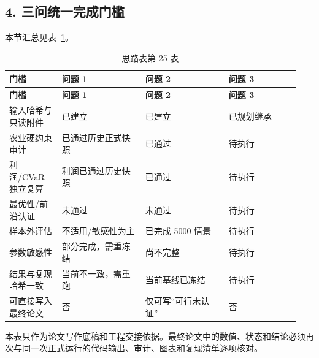 \documentclass[UTF8,11pt,a4paper]{ctexart}
\begin{document}
\subsection{4. 三问统一完成门槛}

\noindent 本节汇总见表~\ref{tab:thought-25}。
\begin{longtable}{@{}>{\raggedright\arraybackslash}p{0.17\linewidth}>{\raggedright\arraybackslash}p{0.27\linewidth}>{\raggedright\arraybackslash}p{0.27\linewidth}>{\raggedright\arraybackslash}p{0.23\linewidth}@{}}
\caption{思路表第 25 表}\label{tab:thought-25}\\
\toprule
\textbf{门槛} & \textbf{问题 1} & \textbf{问题 2} & \textbf{问题 3} \\
\midrule
\endfirsthead
\toprule
\textbf{门槛} & \textbf{问题 1} & \textbf{问题 2} & \textbf{问题 3} \\
\midrule
\endhead
输入哈希与只读附件 & 已建立 & 已建立 & 已规划继承 \\
农业硬约束审计 & 已通过历史正式快照 & 已通过 & 待执行 \\
利润/CVaR独立复算 & 利润已通过历史快照 & 已通过 & 待执行 \\
最优性/前沿认证 & 未通过 & 未通过 & 待执行 \\
样本外评估 & 不适用/敏感性为主 & 已完成 5000 情景 & 待执行 \\
参数敏感性 & 部分完成，需重冻结 & 尚不完整 & 待执行 \\
结果与复现哈希一致 & 当前不一致，需重跑 & 当前基线已冻结 & 待执行 \\
可直接写入最终论文 & 否 & 仅可写“可行未认证” & 否 \\
\bottomrule
\end{longtable}

本表只作为论文写作底稿和工程交接依据。最终论文中的数值、状态和结论必须再次与同一次正式运行的代码输出、审计、图表和复现清单逐项核对。
\end{document}
